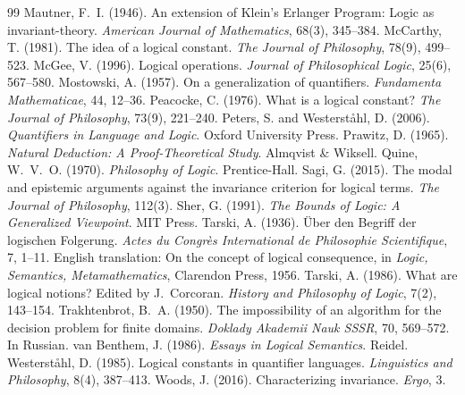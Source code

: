 \documentclass{situationist-preprint}
\begin{document}
\begin{thebibliography}{99}
 Mautner, F.~I. (1946). An extension of Klein's Erlanger Program: Logic as invariant-theory. \emph{American Journal of Mathematics}, 68(3), 345--384.
 McCarthy, T. (1981). The idea of a logical constant. \emph{The Journal of Philosophy}, 78(9), 499--523.
 McGee, V. (1996). Logical operations. \emph{Journal of Philosophical Logic}, 25(6), 567--580.
 Mostowski, A. (1957). On a generalization of quantifiers. \emph{Fundamenta Mathematicae}, 44, 12--36.
 Peacocke, C. (1976). What is a logical constant? \emph{The Journal of Philosophy}, 73(9), 221--240.
 Peters, S. and Westerst{\aa}hl, D. (2006). \emph{Quantifiers in Language and Logic}. Oxford University Press.
 Prawitz, D. (1965). \emph{Natural Deduction: A Proof-Theoretical Study}. Almqvist \& Wiksell.
 Quine, W.~V.~O. (1970). \emph{Philosophy of Logic}. Prentice-Hall.
 Sagi, G. (2015). The modal and epistemic arguments against the invariance criterion for logical terms. \emph{The Journal of Philosophy}, 112(3).
 Sher, G. (1991). \emph{The Bounds of Logic: A Generalized Viewpoint}. MIT Press.
 Tarski, A. (1936). \"Uber den Begriff der logischen Folgerung. \emph{Actes du Congr\`es International de Philosophie Scientifique}, 7, 1--11. English translation: On the concept of logical consequence, in \emph{Logic, Semantics, Metamathematics}, Clarendon Press, 1956.
 Tarski, A. (1986). What are logical notions? Edited by J.~Corcoran. \emph{History and Philosophy of Logic}, 7(2), 143--154.
 Trakhtenbrot, B.~A. (1950). The impossibility of an algorithm for the decision problem for finite domains. \emph{Doklady Akademii Nauk SSSR}, 70, 569--572. In Russian.
 van Benthem, J. (1986). \emph{Essays in Logical Semantics}. Reidel.
 Westerst{\aa}hl, D. (1985). Logical constants in quantifier languages. \emph{Linguistics and Philosophy}, 8(4), 387--413.
 Woods, J. (2016). Characterizing invariance. \emph{Ergo}, 3.
\end{thebibliography}
\end{document}
